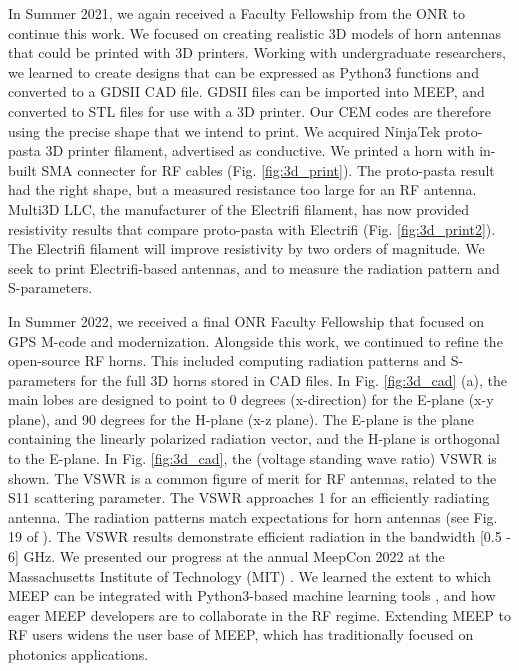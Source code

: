 \documentclass[../../main.tex]{subfiles}
\begin{document}
In Summer 2021, we again received a Faculty Fellowship from the ONR to continue this work.  We focused on creating realistic 3D models of horn antennas that could be printed with 3D printers.  Working with undergraduate researchers, we learned to create designs that can be expressed as Python3 functions and converted to a GDSII CAD file.  GDSII files can be imported into MEEP, and converted to STL files for use with a 3D printer.  Our CEM codes are therefore using the precise shape that we intend to print.  We acquired NinjaTek proto-pasta 3D printer filament, advertised as conductive.  We printed a horn with in-built SMA connecter for RF cables (Fig. \ref{fig:3d_print}). The proto-pasta result had the right shape, but a measured resistance too large for an RF antenna.  Multi3D LLC, the manufacturer of the Electrifi filament, has now provided resistivity results that compare proto-pasta with Electrifi (Fig. \ref{fig:3d_print2}).  The Electrifi filament will improve resistivity by two orders of magnitude.  We seek to print Electrifi-based antennas, and to measure the radiation pattern and S-parameters. \\ \vspace{2.5mm}

In Summer 2022, we received a final ONR Faculty Fellowship that focused on GPS M-code and modernization.  Alongside this work, we continued to refine the open-source RF horns.  This included computing radiation patterns and S-parameters for the full 3D horns stored in CAD files.  In Fig. \ref{fig:3d_cad} (a), the main lobes are designed to point to 0 degrees (x-direction) for the E-plane (x-y plane), and 90 degrees for the H-plane (x-z plane).  The E-plane is the plane containing the linearly polarized radiation vector, and the H-plane is orthogonal to the E-plane.  In Fig. \ref{fig:3d_cad}, the (voltage standing wave ratio) VSWR is shown.  The VSWR is a common figure of merit for RF antennas, related to the S11 scattering parameter.  The VSWR approaches 1 for an efficiently radiating antenna.  The radiation patterns match expectations for horn antennas (see Fig. 19 of \cite{8786183}).  The VSWR results demonstrate efficient radiation in the bandwidth [0.5 - 6] GHz.  We presented our progress at the annual MeepCon 2022 at the Massachusetts Institute of Technology (MIT) \cite{meepcon2022}.  We learned the extent to which MEEP can be integrated with Python3-based machine learning tools \cite{meepcon2022_2}, and how eager MEEP developers are to collaborate in the RF regime.  Extending MEEP to RF users widens the user base of MEEP, which has traditionally focused on photonics applications. \\ \vspace{2.5mm}
\end{document}
